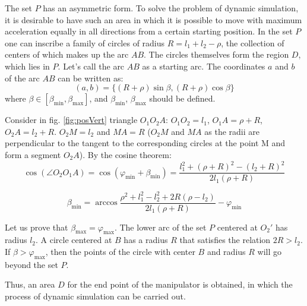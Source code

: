 \documentclass[journal,twocolumn]{IEEEtran}
\begin{document}
The set $ P $ has an asymmetric form. To solve the problem of dynamic simulation, it is desirable to have such an area in which it is possible to move with maximum acceleration equally in all directions from a certain starting position. In the set $ P $ one can inscribe a family of circles of radius $ R = l_1 + l_2 - \rho $, the collection of centers of which makes up the arc $ AB $. The circles themselves form the region $ D $, which lies in $ P $. Let's call the arc $ AB $ as a starting arc. The coordinates $ a $ and $ b $ of the arc $ AB $ can be written as:
\begin{equation}
    (a,b)=\{(R+\rho)\sin\beta, (R+\rho)\cos\beta\}
    \label{eq:circle}
\end{equation}
where $\beta\in[\beta_{\min},\beta_{\max}]$, and $\beta_{\min}$, $\beta_{\max}$ should be defined. 

Consider in fig. \ref{fig:posVert} triangle $ O_1O_2A $: $ O_1O_2 = l_1 $, $ O_1A = \rho + R $, $ O_2A = l_2 + R $. $ O_2M = l_2 $ and $ MA = R $ ($ O_2M $ and $ MA $ as
the radii are perpendicular to the tangent to the corresponding circles at the point M and form a segment $ O_2A $). By the cosine theorem:
\begin{equation*}
    \cos(\angle O_2O_1A)=\cos(\varphi_{\min}+\beta_{\min})=
    \frac{l_1^2+(\rho+R)^2-(l_2+R)^2}{2l_1(\rho+R)}
\end{equation*}

\begin{equation}
    \beta_{\min}=\arccos\frac{\rho^2+l_1^2-l_2^2+2R(\rho-l_2)}{2l_1(\rho+R)}-\varphi_{\min}
\end{equation}

Let us prove that $ \beta _ {\max} = \varphi _ {\max} $. The lower arc of the set $ P $ centered at $ O_2'$ has radius $ l_2 $. A circle centered at $ B $ has a radius $ R $ that satisfies the relation $ 2R> l_2 $. If $ \beta> \varphi _ {\max} $, then the points of the circle with center $ B $ and radius $ R $ will go beyond the set $ P $.

Thus, an area $ D $ for the end point of the manipulator is obtained, in which the process of dynamic simulation can be carried out.
\end{document}
